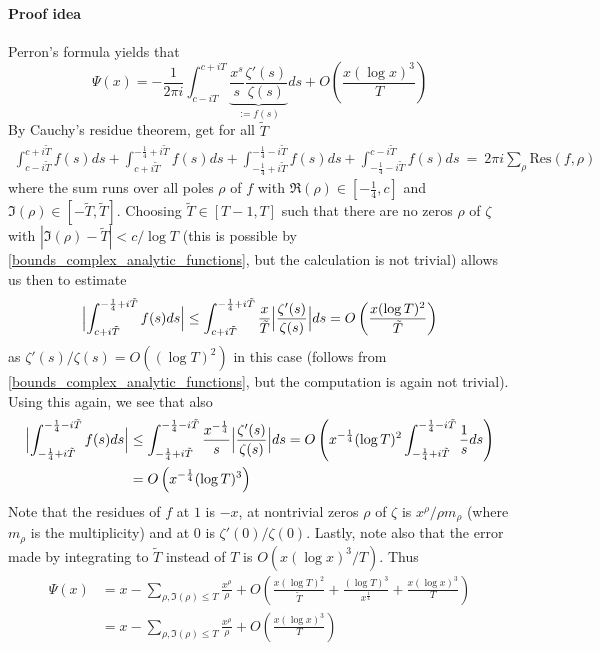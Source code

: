 \paragraph{Proof idea} Perron's formula yields that
\begin{equation*}
    \Psi(x) = -\frac 1 {2\pi i} \int_{c - iT}^{c + iT} \underbrace{\frac {x^s} s \frac {\zeta'(s)} {\zeta(s)}}_{:= f(s)} ds + O\left( \frac {x (\log x)^3} T \right)
\end{equation*}
By Cauchy's residue theorem, get for all $\tilde{T}$
\begin{align*}
    {\int_{c - i\tilde{T}}^{c + i\tilde{T}} f(s)ds + \int_{c + i\tilde{T}}^{-\frac 1 4 + i\tilde{T}} f(s) ds + \int_{-\frac 1 4 + i\tilde{T}}^{-\frac 1 4 - i\tilde{T}} f(s) ds + \int_{-\frac 1 4 - i\tilde{T}}^{c - i\tilde{T}} f(s) ds} \ = \ 2\pi i\sum_\rho \mathrm{Res}(f, \rho)
\end{align*}
where the sum runs over all poles $\rho$ of $f$ with $\Re(\rho) \in [-\frac 1 4, c]$ and $\Im(\rho) \in [-\tilde{T}, \tilde{T}]$.
Choosing $\tilde{T} \in [T - 1, T]$ such that there are no zeros $\rho$ of $\zeta$ with $|\Im(\rho) - \tilde{T}| < c/\log T$ (this is possible by \ref{bounds_complex_analytic_functions}, but the calculation is not trivial) allows us then to estimate
\begin{equation*}
    \Bigl| \int_{c + i\tilde{T}}^{-\frac 1 4 + i\tilde{T}} f(s) ds \Bigr| \leq \int_{c + i\tilde{T}}^{-\frac 1 4 + i\tilde{T}} \frac x {\tilde{T}} \Bigl| \frac {\zeta'(s)} {\zeta(s)} \Bigr| ds = O\left( \frac {x(\log T)^2} {\tilde{T}} \right)
\end{equation*}
as $\zeta'(s)/\zeta(s) = O((\log T)^2)$ in this case (follows from \ref{bounds_complex_analytic_functions}, but the computation is again not trivial).
Using this again, we see that also
\begin{align*}
    \Bigl| \int_{-\frac 1 4 + i\tilde{T}}^{-\frac 1 4 - i\tilde{T}} f(s) ds \Bigr| &\leq \int_{-\frac 1 4 + i\tilde{T}}^{-\frac 1 4 - i\tilde{T}} \frac {x^{-\frac 1 4}} s \Bigl| \frac {\zeta'(s)} {\zeta(s)} \Bigr| ds = O\left( x^{-\frac 1 4} (\log T)^2 \int_{-\frac 1 4 + i\tilde{T}}^{-\frac 1 4 - i\tilde{T}} \frac 1 s ds \right) \\
    &= O\left( x^{-\frac 1 4} (\log T)^3 \right)
\end{align*}
Note that the residues of $f$ at $1$ is $-x$, at nontrivial zeros $\rho$ of $\zeta$ is $x^\rho / \rho m_\rho$ (where $m_\rho$ is the multiplicity) and at $0$ is $\zeta'(0)/\zeta(0)$.
Lastly, note also that the error made by integrating to $\tilde{T}$ instead of $T$ is $O(x(\log x)^3/T)$.
Thus
\begin{align*}
    \Psi(x) &= x - \sum_{\rho, \Im(\rho) \leq T} \frac {x^\rho} \rho + O\left( \frac {x(\log T)^2} {\tilde{T}} + \frac {(\log T)^3} {x^{\frac 1 4}} + \frac {x(\log x)^3} T \right) \\
    &= x - \sum_{\rho, \Im(\rho) \leq T} \frac {x^\rho} \rho + O\left( \frac {x(\log x)^3} T \right)
\end{align*}
